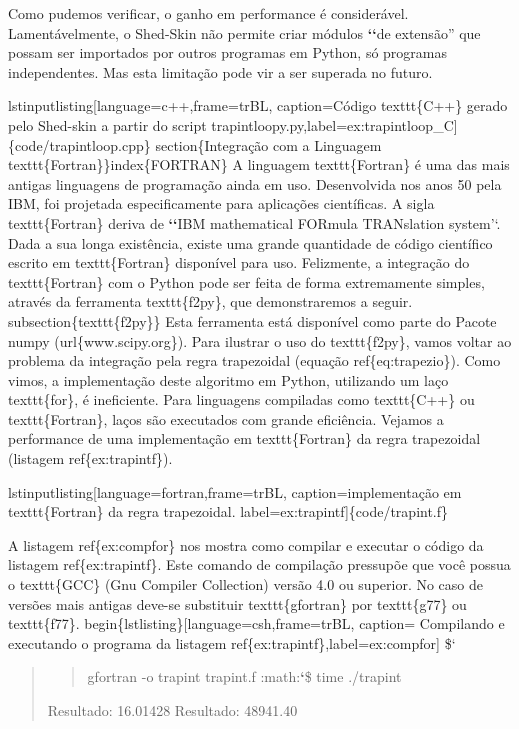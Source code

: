 \documentclass[a4paper,10pt,portuguese]{sphinxmanual}
\begin{document}
Como pudemos verificar, o ganho em performance é considerável. Lamentávelmente, o Shed-Skin não permite criar módulos {\color{red}\bfseries{}{}`{}`}de extensão'' que possam ser importados por outros programas em Python, só programas independentes. Mas esta limitação pode vir a ser superada no futuro.

lstinputlisting{[}language=c++,frame=trBL, caption=Código texttt\{C++\} gerado pelo Shed-skin a partir do script trapintloopy.py,label=ex:trapintloop\_C{]}\{code/trapintloop.cpp\}
section\{Integração com a Linguagem texttt\{Fortran\}\}index\{FORTRAN\}
A linguagem texttt\{Fortran\} é uma das mais antigas linguagens de programação ainda em uso. Desenvolvida nos anos 50 pela IBM, foi projetada especificamente para aplicações científicas. A sigla texttt\{Fortran\} deriva de {\color{red}\bfseries{}{}`{}`}IBM mathematical FORmula TRANslation system'`. Dada a sua longa existência, existe uma grande quantidade de código científico escrito em texttt\{Fortran\} disponível para uso. Felizmente, a integração do texttt\{Fortran\} com o Python pode ser feita de forma extremamente simples, através da ferramenta texttt\{f2py\}, que demonstraremos a seguir.
subsection\{texttt\{f2py\}\}
Esta ferramenta está disponível como parte do Pacote numpy (url\{www.scipy.org\}). Para ilustrar o uso do texttt\{f2py\}, vamos voltar ao problema da integração pela regra trapezoidal (equação ref\{eq:trapezio\}). Como vimos, a implementação deste algoritmo em Python, utilizando um laço texttt\{for\}, é ineficiente. Para linguagens compiladas como texttt\{C++\} ou texttt\{Fortran\}, laços são executados com grande eficiência. Vejamos a performance de uma implementação em texttt\{Fortran\} da regra trapezoidal (listagem ref\{ex:trapintf\}).

lstinputlisting{[}language=fortran,frame=trBL, caption=implementação em texttt\{Fortran\} da regra trapezoidal. label=ex:trapintf{]}\{code/trapint.f\}

A listagem ref\{ex:compfor\} nos mostra como compilar e executar o código da listagem ref\{ex:trapintf\}. Este comando de compilação pressupõe que você possua  o texttt\{GCC\} (Gnu Compiler Collection) versão 4.0 ou superior. No caso de versões mais antigas deve-se substituir texttt\{gfortran\} por texttt\{g77\} ou texttt\{f77\}.
begin\{lstlisting\}{[}language=csh,frame=trBL, caption= Compilando e executando o programa da listagem ref\{ex:trapintf\},label=ex:compfor{]}
\${}`
\begin{quote}
\begin{quote}

gfortran -o trapint trapint.f
:math:{\color{red}\bfseries{}{}`}\$ time ./trapint
\end{quote}

Resultado:    16.01428
Resultado:    48941.40
\end{quote}
\end{document}
